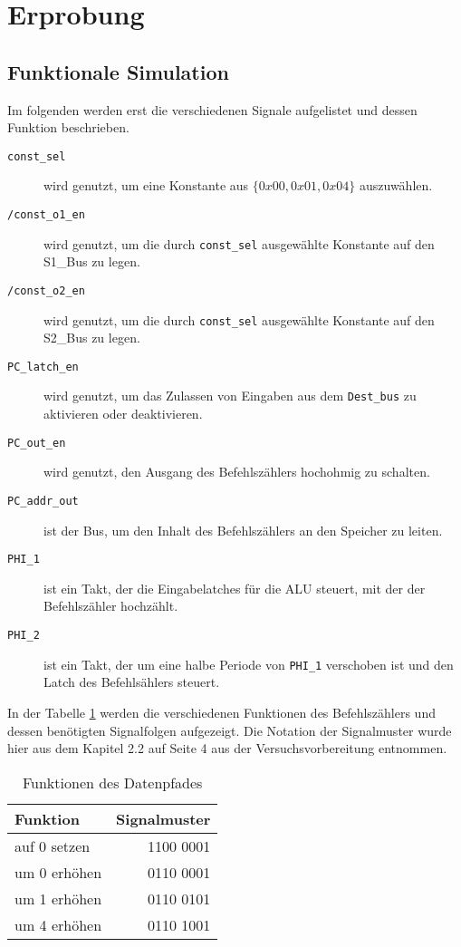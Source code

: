 \documentclass[12pt,a4paper]{scrartcl}
\begin{document}
\section{Erprobung}

\subsection{Funktionale Simulation}
Im folgenden werden erst die verschiedenen Signale aufgelistet und dessen Funktion beschrieben.
\begin{description}
\item [\texttt{const\_sel}] wird genutzt, um eine Konstante aus $\{0x00, 0x01, 0x04\}$ auszuw\"ahlen.
\item [\texttt{/const\_o1\_en}] wird genutzt, um die durch \texttt{const\_sel} ausgew\"ahlte Konstante auf den S1\_Bus zu legen.
\item [\texttt{/const\_o2\_en}] wird genutzt, um die durch \texttt{const\_sel} ausgew\"ahlte Konstante auf den S2\_Bus zu legen.
\item [\texttt{PC\_latch\_en}] wird genutzt, um das Zulassen von Eingaben aus dem \texttt{Dest\_bus} zu aktivieren oder deaktivieren.
\item [\texttt{PC\_out\_en}] wird genutzt, den Ausgang des Befehlsz\"ahlers hochohmig zu schalten.
\item [\texttt{PC\_addr\_out}] ist der Bus, um den Inhalt des Befehlsz\"ahlers an den Speicher zu leiten.
\item [\texttt{PHI\_1}] ist ein Takt, der die Eingabelatches f\"ur die ALU steuert, mit der der Befehlsz\"ahler hochz\"ahlt.
\item [\texttt{PHI\_2}] ist ein Takt, der um eine halbe Periode von \texttt{PHI\_1} verschoben ist und den Latch des Befehls\"ahlers steuert.
\end{description}

In der Tabelle \ref{funktion} werden die verschiedenen Funktionen des Befehlsz\"ahlers und dessen ben\"otigten Signalfolgen aufgezeigt. Die Notation der Signalmuster wurde hier aus dem Kapitel 2.2 auf Seite 4 aus der Versuchsvorbereitung entnommen.

\begin{table}[h]
    \centering
    \begin{tabular}{l|r}
    \hline
    Funktion       & Signalmuster \\
    \hline
    auf 0 setzen   & 1100 0001 \\
    um 0 erh\"ohen & 0110 0001 \\
    um 1 erh\"ohen & 0110 0101 \\
    um 4 erh\"ohen & 0110 1001 \\
    \hline
    \end{tabular}
    \caption{Funktionen des Datenpfades}
    \label{funktion}
\end{table}
\end{document}
